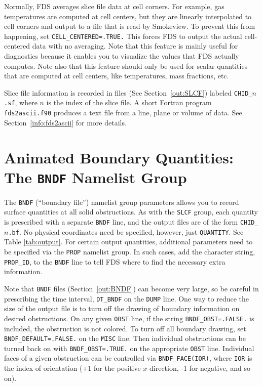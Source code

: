 \documentclass[11pt]{book}
\newcommand{\ct}{\tt\small}
\begin{document}
Normally, FDS averages slice file data at cell corners. For example, gas temperatures are computed at cell centers, but they
are linearly interpolated to cell corners and output to a file that is read by Smokeview. To prevent this from happening,
set {\ct CELL\_CENTERED=.TRUE.} This forces FDS to output the actual cell-centered data with no averaging. Note that this
feature is mainly useful for diagnostics because it enables you to visualize the values that FDS actually computes. Note also that this
feature should only be used for scalar quantities that are computed at cell centers, like temperatures, mass fractions, etc.

Slice file information is recorded in files (See Section~\ref{out:SLCF})
labeled {\ct CHID\_$n$.sf}, where $n$ is the index of the slice file.
A short Fortran program {\ct fds2ascii.f90} produces a text file from a line,
plane or volume of data. See Section~\ref{info:fds2ascii} for more details.






\section{Animated Boundary Quantities: The \texorpdfstring{{\tt BNDF}}{BNDF} Namelist Group}
\label{info:BNDF}

The {\ct BNDF} (``boundary file'') namelist group parameters allows you
to record surface quantities at all solid obstructions. As with
the {\ct SLCF} group, each quantity is prescribed with a separate
{\ct BNDF} line, and the output files are of the form {\ct CHID\_$n$.bf}.
No physical coordinates need be specified, however, just {\ct QUANTITY}.
See Table \ref{tab:output}. For certain output quantities, additional parameters need to be specified via
the {\ct PROP} namelist group. In such cases, add the character string, {\ct PROP\_ID}, to the {\ct BNDF} line
to tell FDS where to find the necessary extra information.

Note that {\ct BNDF} files (Section~\ref{out:BNDF}) can become very
large, so be careful in prescribing the time interval, {\ct DT\_BNDF} on the {\ct DUMP} line.
One way to reduce the size of the output file is to turn off the
drawing of boundary information on desired obstructions. On any given
{\ct OBST} line, if the string {\ct BNDF\_OBST=.FALSE.} is included,
the obstruction is not colored. To turn off all boundary drawing,
set {\ct BNDF\_DEFAULT=.FALSE.} on the {\ct MISC} line. Then individual
obstructions can be turned back on with {\ct BNDF\_OBST=.TRUE.} on
the appropriate {\ct OBST} line. Individual faces of a given obstruction can be controlled
via {\ct BNDF\_FACE(IOR)}, where {\ct IOR} is the index of orientation (+1 for the positive $x$ direction, -1 for negative, and so on).
\end{document}
